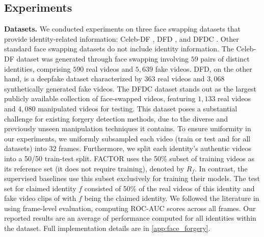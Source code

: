 \documentclass{article} \usepackage{iclr2024_conference,times}
\begin{document}
\subsection{Experiments}
\textbf{Datasets.} We conducted experiments on three face swapping datasets that provide identity-related information: Celeb-DF \citep{celeb_df}, DFD \citep{dfd}, and DFDC \citep{dfdc}. Other standard face swapping datasets do not include identity information. The Celeb-DF dataset was generated through face swapping involving $59$ pairs of distinct identities, comprising $590$ real videos and $5,639$ fake videos. DFD, on the other hand, is a deepfake dataset characterized by $363$ real videos and $3,068$ synthetically generated fake videos. The DFDC dataset stands out as the largest publicly available collection of face-swapped videos, featuring $1,133$ real videos and $4,080$ manipulated videos for testing. This dataset poses a substantial challenge for existing forgery detection methods, due to the diverse and previously unseen manipulation techniques it contains. To ensure uniformity in our experiments, we uniformly subsampled each video (train or test and for all datasets) into $32$ frames. Furthermore, we split each identity's authentic videos into a 50/50 train-test split. FACTOR uses the 50\% subset of training videos as its reference set (it does not require training), denoted by $R_f$. In contrast, the supervised baselines use this subset exclusively for training their models. The test set for claimed identity $f$ consisted of 50\% of the real videos of this identity and fake video clips of with $f$ being the claimed identity. We followed the literature in using frame-level evaluation, computing ROC-AUC scores across all frames. Our reported results are an average of performance computed for all identities within the dataset. Full implementation details are in \cref{app:face_forgery}.
\end{document}
